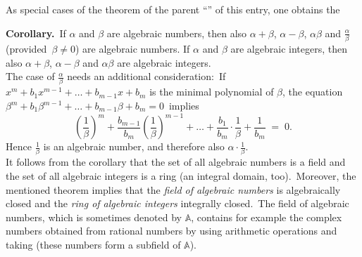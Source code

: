 \documentclass[12pt]{article}
\theoremstyle{definition}
\begin{document}
As special cases of the theorem of the parent 
``'' of this entry, one obtains the 

\textbf{Corollary.}\, If $\alpha$ and $\beta$ are algebraic numbers, then also $\alpha\!+\!\beta$, $\alpha\!-\!\beta$, 
$\alpha\beta$ and $\displaystyle\frac{\alpha}{\beta}$ (provided\, $\beta \neq 0$) are algebraic numbers.\; If $\alpha$ and $\beta$ are algebraic integers, then also $\alpha\!+\!\beta$, $\alpha\!-\!\beta$ and
$\alpha\beta$ are algebraic integers.\\

The case of $\displaystyle\frac{\alpha}{\beta}$ needs an additional consideration:\, If 
$x^m+b_1x^{m-1}+\ldots+b_{m-1}x+b_m$ is the minimal polynomial of $\beta$, the equation 
\,$\beta^m+b_1\beta^{m-1}+\ldots+b_{m-1}\beta+b_m = 0$\, implies
$$\left(\frac{1}{\beta}\right)^m\!+\frac{b_{m-1}}{b_m}\!\left(\frac{1}{\beta}\right)^{m-1}\!+\ldots+
\frac{b_1}{b_m}\!\cdot\!\frac{1}{\beta}+\frac{1}{b_m} \;=\; 0.$$
Hence $\displaystyle\frac{1}{\beta}$ is an algebraic number, and therefore also 
$\displaystyle\alpha\!\cdot\!\frac{1}{\beta}$.\\



It follows from the corollary that the set of all algebraic numbers is a field and the set of all algebraic integers is a ring (an integral domain, too).\, Moreover, the mentioned theorem implies that the \emph{field of algebraic numbers} is algebraically closed and the \emph{ring of algebraic integers} integrally closed.\, The field of algebraic numbers, which is sometimes denoted by $\mathbb{A}$, contains for example the complex numbers obtained from rational numbers by using arithmetic operations and taking  (these numbers form a subfield of $\mathbb{A}$).
\end{document}
